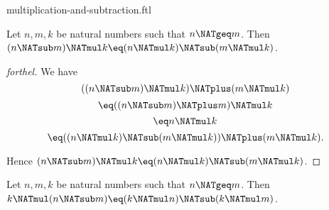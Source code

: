 \documentclass{stex}
\begin{document}
\begin{smodule}{multiplication-and-subtraction.ftl}

\begin{proposition}[forthel,id=ARITHMETIC_06_5458841930039296]
  Let $n, m, k$ be natural numbers such that $n \NATgeq m$.
  Then $(n \NATsub m) \NATmul k \eq (n \NATmul k) \NATsub (m \NATmul k)$.
\end{proposition}
\begin{proof}[forthel]
  We have
  \[  ((n \NATsub m) \NATmul k) \NATplus (m \NATmul k)                 \]
  \[    \eq ((n \NATsub m) \NATplus m) \NATmul k                       \]
  \[    \eq n \NATmul k                                   \]
  \[    \eq ((n \NATmul k) \NATsub (m \NATmul k)) \NATplus (m \NATmul k).  \]

  Hence $(n \NATsub m) \NATmul k \eq (n \NATmul k) \NATsub (m \NATmul k)$.
\end{proof}

\begin{corollary}[forthel,id=ARITHMETIC_06_8461123277815808]
  Let $n, m, k$ be natural numbers such that $n \NATgeq m$.
  Then $k \NATmul (n \NATsub m) \eq (k \NATmul n) \NATsub (k \NATmul m)$.
\end{corollary}
\end{smodule}
\end{document}
